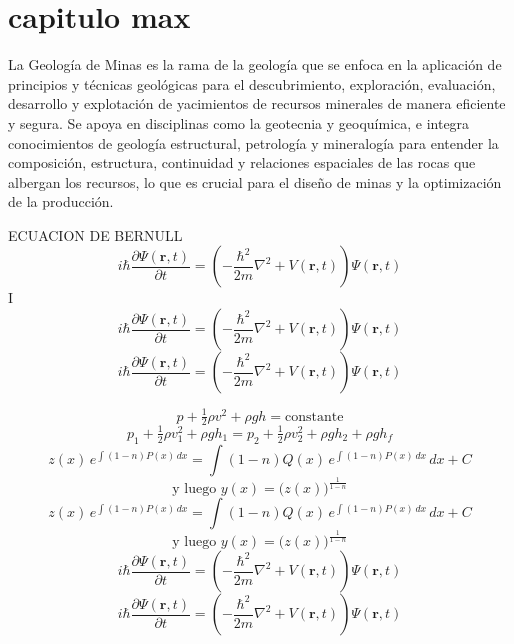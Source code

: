 \section{capitulo max}
La Geología de Minas es la rama de la geología que se enfoca en la aplicación de principios y técnicas geológicas para el descubrimiento, exploración, evaluación, desarrollo y explotación de yacimientos de recursos minerales de manera eficiente y segura. Se apoya en disciplinas como la geotecnia y geoquímica, e integra conocimientos de geología estructural, petrología y mineralogía para entender la composición, estructura, continuidad y relaciones espaciales de las rocas que albergan los recursos, lo que es crucial para el diseño de minas y la optimización de la producción.

ECUACION DE BERNULL
\[
i\hbar \frac{\partial \Psi(\mathbf{r},t)}{\partial t}
=
\left(
-\frac{\hbar^{2}}{2m}\nabla^{2} + V(\mathbf{r},t)
\right)\Psi(\mathbf{r},t)
\]
I\[
i\hbar \frac{\partial \Psi(\mathbf{r},t)}{\partial t}
=
\left(
-\frac{\hbar^{2}}{2m}\nabla^{2} + V(\mathbf{r},t)
\right)\Psi(\mathbf{r},t)
\]
\[
i\hbar \frac{\partial \Psi(\mathbf{r},t)}{\partial t}
=
\left(
-\frac{\hbar^{2}}{2m}\nabla^{2} + V(\mathbf{r},t)
\right)\Psi(\mathbf{r},t)
\]
 
\[
p + \tfrac{1}{2}\rho v^{2} + \rho g h = \text{constante}
\]
\[
p_1 + \tfrac{1}{2}\rho v_1^{2} + \rho g h_1
=
p_2 + \tfrac{1}{2}\rho v_2^{2} + \rho g h_2 + \rho g h_f
\]
\[
z(x) \, e^{\int (1-n)P(x)\,dx}
=
\int (1-n)Q(x)\, e^{\int (1-n)P(x)\,dx}\,dx + C
\]
\[
\text{y luego } y(x) = \bigl(z(x)\bigr)^{\frac{1}{1-n}}
\]
\[
z(x) \, e^{\int (1-n)P(x)\,dx}
=
\int (1-n)Q(x)\, e^{\int (1-n)P(x)\,dx}\,dx + C
\]
\[
\text{y luego } y(x) = \bigl(z(x)\bigr)^{\frac{1}{1-n}}
\]
\[
i\hbar \frac{\partial \Psi(\mathbf{r},t)}{\partial t}
=
\left(
-\frac{\hbar^{2}}{2m}\nabla^{2} + V(\mathbf{r},t)
\right)\Psi(\mathbf{r},t)
\]
\[
i\hbar \frac{\partial \Psi(\mathbf{r},t)}{\partial t}
=
\left(
-\frac{\hbar^{2}}{2m}\nabla^{2} + V(\mathbf{r},t)
\right)\Psi(\mathbf{r},t)
\]
